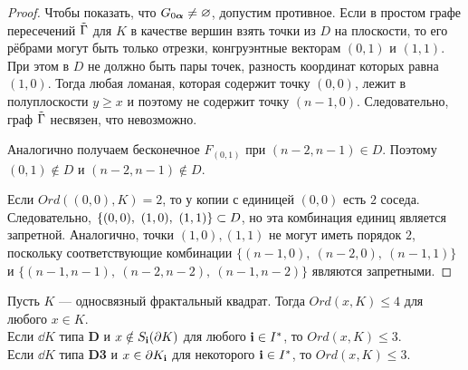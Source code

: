\begin{proof}
Чтобы показать, что $G_{0{\bm{\alpha}}}\neq\varnothing$, допустим противное.
Если в простом графе пересечений $\tilde{\Gamma}$ для $K$ в качестве вершин взять точки из $D$ на плоскости, то его рёбрами могут быть только отрезки, конгруэнтные векторам $(0,1)$ и $(1,1)$.
При этом в $D$ не должно быть пары точек, разность координат которых равна $(1,0)$.
Тогда любая ломаная, которая содержит точку $(0,0)$, лежит в полуплоскости $y\ge x$ и поэтому не содержит точку $(n-1,0)$.
Следовательно, граф $\tilde{\Gamma}$ несвязен, что невозможно.

Аналогично получаем бесконечное $F_{(0,1)}$ при $(n-2,n-1)\in D$.
Поэтому $(0,1)\notin D$ и $(n-2,n-1)\notin D$. 
 
Если $Ord((0,0),K)=2$, то у копии с единицей $(0,0)$ есть $2$ соседа. 
Следовательно, $\{(0,0),\ (1,0),\ (1,1)\}\IN D$, но эта комбинация единиц является запретной.
Аналогично, точки $(1,0), (1,1)$ не могут иметь порядок $2$, поскольку соответствующие комбинации $\{(n-1,0),\ (n-2,0),\ (n-1,1)\}$ и $\{(n-1,n-1),\ (n-2,n-2),\ (n-1,n-2)\}$ являются запретными. 
\end{proof} 

\begin{theorem}\label{order}
Пусть $K$ --- односвязный фрактальный квадрат. 
Тогда $Ord(x,K)\le 4$ для любого $x\in K$.\\
Если $\dd K$ типа {\bf D} и $x\notin S_{\bf{i}}(\partial K)$ для любого ${\bf{i}}\in I^*$, то $Ord(x,K)\le 3$.\\
Если $\dd K$ типа {\bf D3} и $x\in \partial K_{\bf{i}}$ для некоторого ${\bf{i}}\in I^*$, то $Ord(x, K)\le 3$.
\end{theorem}


